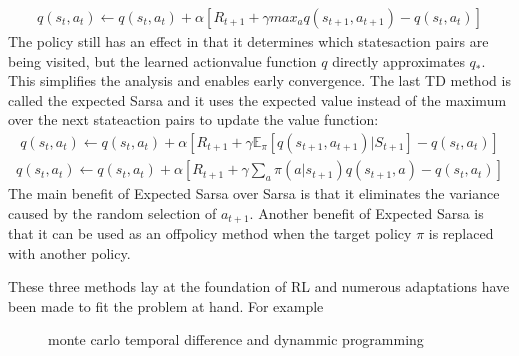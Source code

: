 \documentclass[letterpaper,10pt,english]{jupyterBook}
\let\sphinxpxdimen\pdfpxdimen\else\newdimen\sphinxpxdimen
\begin{document}
\begin{equation*}
\begin{split}  q(s_t, a_t) \leftarrow q(s_t, a_t) + \alpha[R_{t+1} + \gamma max_a q(s_{t+1}, a_{t+1}) - q(s_t, a_t)]  \end{split}
\end{equation*}
\sphinxAtStartPar
The policy still has an effect in that it determines which states\sphinxhyphen{}action pairs are being visited, but the learned action\sphinxhyphen{}value function \(q\) directly approximates \(q_*\). This simplifies the analysis and enables early convergence. The last TD method is called the expected Sarsa and it uses the expected value instead of the maximum over the next state\sphinxhyphen{}action pairs to update the value function:
\begin{equation*}
\begin{split}  q(s_t, a_t) \leftarrow q(s_t, a_t) + \alpha[R_{t+1} + \gamma \mathbb{E}_{\pi}[q(s_{t+1}, a_{t+1})|S_{t+1}] - q(s_t, a_t)] \end{split}
\end{equation*}\begin{equation*}
\begin{split} q(s_t, a_t) \leftarrow q(s_t, a_t) + \alpha[R_{t+1} + \gamma \sum_a \pi(a|s_{t+1}) q(s_{t+1}, a) - q(s_t, a_t)] \end{split}
\end{equation*}
\sphinxAtStartPar
The main benefit of Expected Sarsa over Sarsa is that it eliminates the variance caused by the random selection of \(a_{t+1}\). Another benefit of Expected Sarsa is that it can be used as an off\sphinxhyphen{}policy method when the target policy \(\pi\) is replaced with another policy.

\sphinxAtStartPar
These three methods lay at the foundation of RL and numerous adaptations have been made to fit the problem at hand. For example

\begin{figure}[htbp]
\centering
\capstart

\noindent\sphinxincludegraphics[width=500\sphinxpxdimen,height=350\sphinxpxdimen]{{different_methods}.png}
\caption{monte carlo temporal difference and dynammic programming}\label{\detokenize{Reinforcement_learning:diff-meth-fig}}\end{figure}
\end{document}
